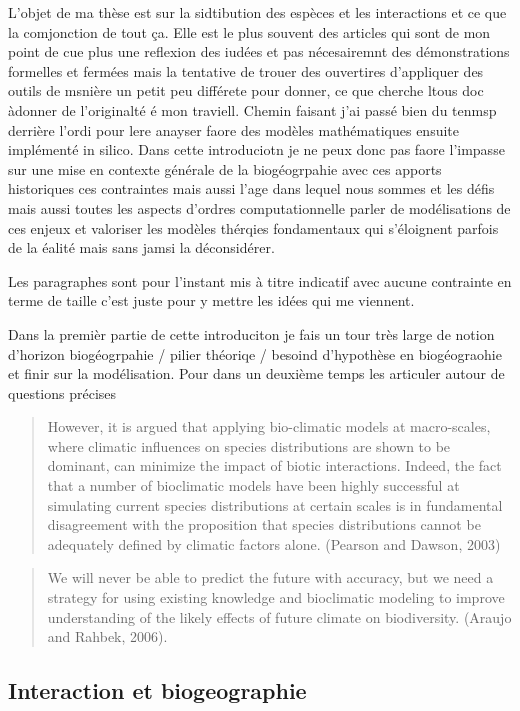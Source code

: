 L'objet de ma thèse est sur la sidtibution des espèces et les
interactions et ce que la comjonction de tout ça. Elle est le plus
souvent des articles qui sont de mon point de cue plus une reflexion des
iudées et pas nécesairemnt des démonstrations formelles et fermées mais
la tentative de trouer des ouvertires d'appliquer des outils de msnière
un petit peu différete pour donner, ce que cherche ltous doc àdonner de
l'originalté é mon traviell. Chemin faisant j'ai passé bien du tenmsp
derrière l'ordi pour lere anayser faore des modèles mathématiques
ensuite implémenté in silico. Dans cette introduciotn je ne peux donc
pas faore l'impasse sur une mise en contexte générale de la
biogéogrpahie avec ces apports historiques ces contraintes mais aussi
l'age dans lequel nous sommes et les défis mais aussi toutes les aspects
d'ordres computationnelle parler de modélisations de ces enjeux et
valoriser les modèles thérqies fondamentaux qui s'éloignent parfois de
la éalité mais sans jamsi la déconsidérer.

Les paragraphes sont pour l'instant mis à titre indicatif avec aucune
contrainte en terme de taille c'est juste pour y mettre les idées qui me
viennent.

Dans la premièr partie de cette introduciton je fais un tour très large
de notion d'horizon biogéogrpahie / pilier théoriqe / besoind
d'hypothèse en biogéograohie et finir sur la modélisation. Pour dans un
deuxième temps les articuler autour de questions précises

\begin{quote}
However, it is argued that applying bio-climatic models at macro-scales,
where climatic influences on species distributions are shown to be
dominant, can minimize the impact of biotic interactions. Indeed, the
fact that a number of bioclimatic models have been highly successful at
simulating current species distributions at certain scales is in
fundamental disagreement with the proposition that species distributions
cannot be adequately defined by climatic factors alone. (Pearson and
Dawson, 2003)
\end{quote}

\begin{quote}
We will never be able to predict the future with accuracy, but we need a
strategy for using existing knowledge and bioclimatic modeling to
improve understanding of the likely effects of future climate on
biodiversity. (Araujo and Rahbek, 2006).
\end{quote}

\subsection{Interaction et
biogeographie}\label{interaction-et-biogeographie}

